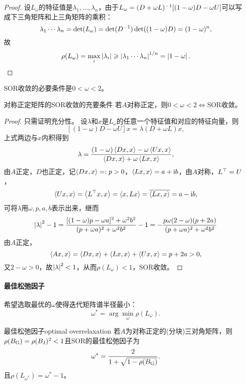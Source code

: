 \begin{proof}
    设$L_\omega$的特征值是$\lambda_1,\ldots,\lambda_n$，由于$L_\omega=(D+\omega L)^{-1}[(1-\omega)D-\omega U]$可以写成下三角矩阵和上三角矩阵的乘积：
    \[
        \lambda_1\cdots\lambda_n=\det(L_\omega)=\det(D^{-1})\det((1-\omega)D)=(1-\omega)^n,
    \]
    故
    \[
        \rho(L_\omega)=\max_i\left\lvert\lambda_i\right\rvert\geqslant\left\lvert\lambda_1\cdots\lambda_n\right\rvert^{1/n}=\left\lvert1-\omega\right\rvert.
        \qedhere
    \]
\end{proof}

\begin{corollary}
    SOR收敛的必要条件是$0<\omega<2$。
\end{corollary}

\begin{theorem}
    {对称正定矩阵的SOR收敛的充要条件}{}
    若$A$对称正定，则$0<\omega<2\iff$SOR收敛。
\end{theorem}

\begin{proof}
    只需证明充分性。
    设$\lambda$和$x$是$L_\omega$的任意一个特征值和对应的特征向量，则
    \[
        [(1-\omega)D-\omega U]x=\lambda(D+\omega L)x,
    \]
    上式两边与$x$内积得到
    \[
        \lambda=\frac{(1-\omega)\left\langle Dx,x\right\rangle-\omega\left\langle Ux,x\right\rangle}{\left\langle Dx,x\right\rangle+\omega\left\langle Lx,x\right\rangle},
    \]
    由$A$正定，$D$也正定，记$\left\langle Dx,x\right\rangle=:p>0$，$\left\langle Lx,x\right\rangle=a+\mathrm{i} b$，由$A$对称，$L^\top=U$，
    \[
        \left\langle Ux,x\right\rangle=\left\langle L^\top x,x\right\rangle=\left\langle x,Lx\right\rangle=\overline{\left\langle Lx,x\right\rangle}=a-\mathrm{i} b,
    \]
    可将$\lambda$用$\omega,p,a,b$表示出来，继而
    \[
        \left\lvert\lambda\right\rvert^2-1=\frac{[(1-\omega)p-\omega a]^2+\omega^2b^2}{(p+\omega a)^2+\omega^2b^2}-1=-\frac{p\omega(2-\omega)(p+2a)}{(p+\omega a)^2+\omega^2b^2}
    \]
    由$A$正定，
    \[
        \left\langle Ax,x\right\rangle=\left\langle Dx,x\right\rangle+\left\langle Lx,x\right\rangle+\left\langle Ux,x\right\rangle=p+2a>0,
    \]
    又$2-\omega>0$，故$\left\lvert\lambda\right\rvert^2<1$，从而$\rho(L_\omega)<1$，SOR收敛。
\end{proof}

\paragraph{最佳松弛因子}

希望选取最优的$\omega$使得迭代矩阵谱半径最小：
\begin{equation}
    \omega^*=\arg\min_{\omega}\rho(L_\omega).
\end{equation}

\begin{theorem}
    {最佳松弛因子}{optimal overrelaxation}
    若$A$为对称正定的(分块)三对角矩阵，则$\rho(B_\text G)=\rho(B_\text J)^2<1$且SOR的最佳松弛因子为
    \begin{equation}
        \omega^*=\frac2{1+\sqrt{1-\rho(B_\text G)}}.
    \end{equation}
    且$\rho(L_{\omega^*})=\omega^*-1$。
\end{theorem}

